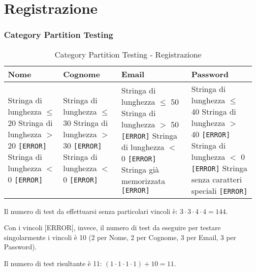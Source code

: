 \section{Registrazione}
\subsubsection*{Category Partition Testing}
\begin{table}[H]
	\centering
	\footnotesize
	\renewcommand{\arraystretch}{1.3}
	\begin{tabular}{|p{3cm}|p{3cm}|p{4cm}|p{5cm}|}
		\hline
		\textbf{Nome} & \textbf{Cognome} & \textbf{Email} & \textbf{Password} \\
		\hline
		Stringa di lunghezza $\leq$ 20 \newline
		Stringa di lunghezza $>$ 20 \texttt{[ERROR]} \newline
		Stringa di lunghezza $<$ 0 \texttt{[ERROR]} &

		Stringa di lunghezza $\leq$ 30 \newline
		Stringa di lunghezza $>$ 30 \texttt{[ERROR]} \newline
		Stringa di lunghezza $<$ 0 \texttt{[ERROR]} &

		Stringa di lunghezza $\leq$ 50 \newline
		Stringa di lunghezza $>$ 50 \texttt{[ERROR]} \newline
		Stringa di lunghezza $<$ 0 \texttt{[ERROR]} \newline
		Stringa già memorizzata \texttt{[ERROR]} &

		Stringa di lunghezza $\leq$ 40 \newline
		Stringa di lunghezza $>$ 40 \texttt{[ERROR]} \newline
		Stringa di lunghezza $<$ 0 \texttt{[ERROR]} \newline
		Stringa senza caratteri speciali \texttt{[ERROR]} \\
		\hline
	\end{tabular}
	\caption{Category Partition Testing - Registrazione}
\end{table}

\noindent Il numero di test da effettuarsi senza particolari vincoli è: $3 \cdot 3 \cdot 4 \cdot 4 = 144$.

\noindent Con i vincoli [ERROR], invece, il numero di test da eseguire per testare singolarmente i vincoli è 10 (2 per Nome, 2 per Cognome, 3 per Email, 3 per Password).

\noindent Il numero di test risultante è 11: $(1 \cdot 1 \cdot 1 \cdot 1) + 10 = 11$.


